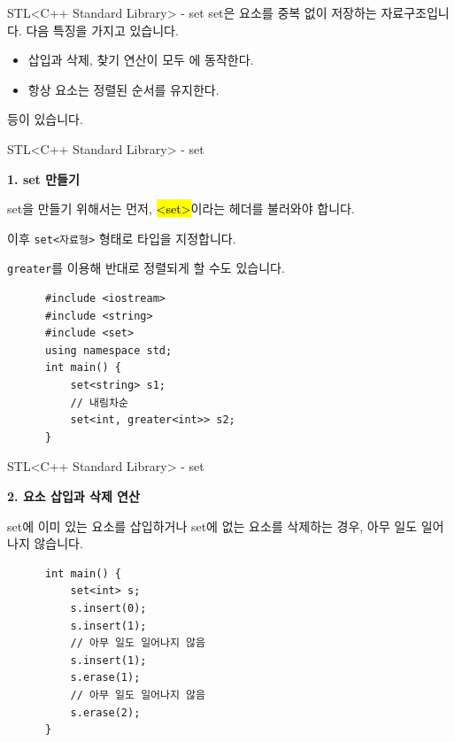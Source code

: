 
\begin{frame}{STL}{<C++ Standard Library> - set}
  \vspace{6mm}
  \alert{set}은 요소를 중복 없이 저장하는 자료구조입니다. 다음 특징을 가지고 있습니다.
  \vspace{4mm}
  \begin{itemize}
    \item 삽입과 삭제, 찾기 연산이 모두 에 동작한다.
    \item 항상 요소는 정렬된 순서를 유지한다.
  \end{itemize}
  \vspace{2mm}
  등이 있습니다.
\end{frame}

\begin{frame}[fragile]{STL}{<C++ Standard Library> - set}
  \begin{twocol}
    \vspace{4mm}
    \textbf{1. set 만들기}\par\vspace{2mm}
    set을 만들기 위해서는 먼저, \hl{<set>}이라는 헤더를 불러와야 합니다.\par\vspace{2mm}
    이후 \texttt{set<자료형>} 형태로 타입을 지정합니다.\par\vspace{2mm}
    \texttt{greater}를 이용해 반대로 정렬되게 할 수도 있습니다.
  \colsplit
    \begin{verbatim}
      #include <iostream>
      #include <string>
      #include <set>
      using namespace std;
      int main() {
          set<string> s1;
          // 내림차순
          set<int, greater<int>> s2;
      }
    \end{verbatim}
  \end{twocol}
\end{frame}

\begin{frame}[fragile]{STL}{<C++ Standard Library> - set}
  \begin{twocol}
    \vspace{6mm}
    \textbf{2. 요소 삽입과 삭제 연산}\par\vspace{2mm}
    set에 이미 있는 요소를 삽입하거나 set에 없는 요소를 삭제하는 경우, 아무 일도
    일어나지 않습니다.
  \colsplit
    \begin{verbatim}
      int main() {
          set<int> s;
          s.insert(0);
          s.insert(1);
          // 아무 일도 일어나지 않음
          s.insert(1);
          s.erase(1);
          // 아무 일도 일어나지 않음
          s.erase(2);
      }
    \end{verbatim}
  \end{twocol}
\end{frame}

